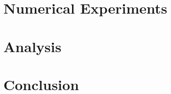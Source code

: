 \documentclass[11pt]{article}
\theoremstyle{definition}
\begin{document}
\section{Numerical Experiments}
\label{sec:numExperiments}


\section{Analysis}
\label{sec:analysis}


\section{Conclusion}
\label{sec:conclusion}





\end{document}
